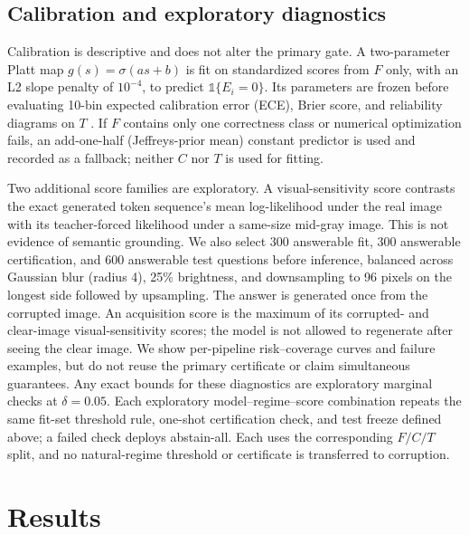 \documentclass[11pt]{article}
\newcommand{\ExploratoryFailureProb}{0.05}
\begin{document}
\subsection{Calibration and exploratory diagnostics}

Calibration is descriptive and does not alter the primary gate.  A two-parameter
Platt map $g(s)=\sigma(as+b)$ is fit on standardized scores from $F$ only, with
an L2 slope penalty of $10^{-4}$, to predict
$\mathbb{1}\{E_i=0\}$.  Its parameters are frozen before evaluating 10-bin expected
calibration error (ECE), Brier score, and reliability diagrams on $T$
\citep{pmlr-v70-guo17a}.  If $F$ contains only one correctness class or numerical
optimization fails, an add-one-half (Jeffreys-prior mean) constant predictor is used and recorded as a
fallback; neither $C$ nor $T$ is used for fitting.

Two additional score families are exploratory.  A visual-sensitivity score
contrasts the exact generated token sequence's mean log-likelihood under the real
image with its teacher-forced likelihood under a same-size mid-gray image.  This is
not evidence of semantic grounding.  We also select 300 answerable fit, 300
answerable certification, and 600 answerable test questions before inference,
balanced across Gaussian blur (radius 4), 25\% brightness, and downsampling to 96
pixels on the longest side followed by upsampling.  The answer is generated once
from the corrupted image.  An acquisition score is the maximum of its corrupted-
and clear-image visual-sensitivity scores; the model is not allowed to regenerate
after seeing the clear image.  We show per-pipeline risk--coverage curves and
failure examples, but do not reuse the primary certificate or claim simultaneous
guarantees.  Any exact bounds for these diagnostics are exploratory marginal checks
at $\delta=\ExploratoryFailureProb$.  Each exploratory model--regime--score
combination repeats the same fit-set threshold rule, one-shot certification check,
and test freeze defined above; a failed check deploys abstain-all.  Each uses the
corresponding $F/C/T$ split, and no natural-regime threshold or certificate is
transferred to corruption.

\section{Results}
\label{sec:results}
\end{document}
